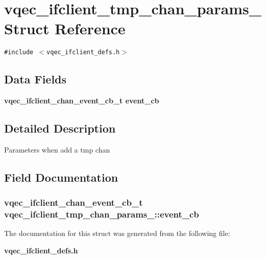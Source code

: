 \section{vqec\_\-ifclient\_\-tmp\_\-chan\_\-params\_\- Struct Reference}
\label{structvqec__ifclient__tmp__chan__params__}
{\tt \#include $<$vqec\_\-ifclient\_\-defs.h$>$}

\subsection*{Data Fields}
\begin{CompactItemize}
\item 
\bf{vqec\_\-ifclient\_\-chan\_\-event\_\-cb\_\-t} \bf{event\_\-cb}
\end{CompactItemize}


\subsection{Detailed Description}
Parameters when add a tmp chan 



\subsection{Field Documentation}
\subsubsection{\setlength{\rightskip}{0pt plus 5cm}\bf{vqec\_\-ifclient\_\-chan\_\-event\_\-cb\_\-t} \bf{vqec\_\-ifclient\_\-tmp\_\-chan\_\-params\_\-::event\_\-cb}}\label{structvqec__ifclient__tmp__chan__params___a0dde5cb9eecfb62706a59f12b391d63}




The documentation for this struct was generated from the following file:\begin{CompactItemize}
\item 
\bf{vqec\_\-ifclient\_\-defs.h}\end{CompactItemize}
